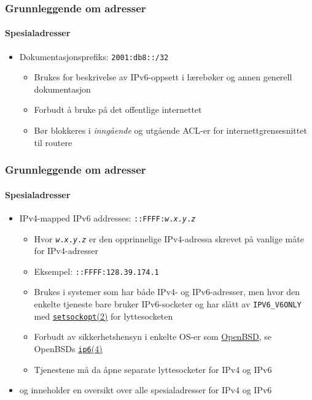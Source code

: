 \begin{frame}%
  \frametitle{Grunnleggende om adresser}
  \framesubtitle{Spesialadresser}
  \begin{itemize}%
  \item Dokumentasjonsprefiks: \texttt{2001:db8::/32}
    \begin{itemize}%
    \item Brukes for beskrivelse av IPv6-oppsett i lærebøker og annen
      generell dokumentasjon 
    \item Forbudt å bruke på det offentlige internettet
    \item Bør blokkeres i \textit{inngående\/} og utgående ACL-er for
      internettgrensesnittet til routere
    \end{itemize}
  \end{itemize}
\end{frame}

\begin{frame}%
  \frametitle{Grunnleggende om adresser}
  \framesubtitle{Spesialadresser}
  \begin{itemize}%
  \item IPv4-mapped IPv6 addresses:
    \texttt{::FFFF:\textit{w}.\textit{x}.\textit{y}.\textit{z}}
    \begin{itemize}%
    \item Hvor \texttt{\textit{w}.\textit{x}.\textit{y}.\textit{z}} er
      den opprinnelige IPv4-adressa skrevet på vanlige måte for IPv4-adresser
    \item Eksempel: \texttt{::FFFF:128.39.174.1}
    \item Brukes i systemer som har både IPv4- og IPv6-adresser, men
      hvor den enkelte tjeneste bare bruker IPv6-socketer og har slått
      av \texttt{IPV6\_V6ONLY} med
      \href{http://www.freebsd.org/cgi/man.cgi?query=setsockopt&apropos=0&sektion=2&manpath=FreeBSD+9.1-RELEASE&arch=default&format=html}{\texttt{setsockopt}(2)}
      for lyttesocketen
    \item Forbudt av sikkerhetshensyn i enkelte OS-er som
      \href{http://www.openbsd.org/}{OpenBSD}, se OpenBSDs
      \href{http://www.openbsd.org/cgi-bin/man.cgi?query=ip6&sektion=4}{\texttt{ip6}(4)}
    \item Tjenestene må da åpne separate lyttesocketer for IPv4 og
      IPv6
    \end{itemize}
  \item {} og  inneholder en oversikt over alle
    spesialadresser for IPv4 og IPv6
  \end{itemize}
\end{frame}

